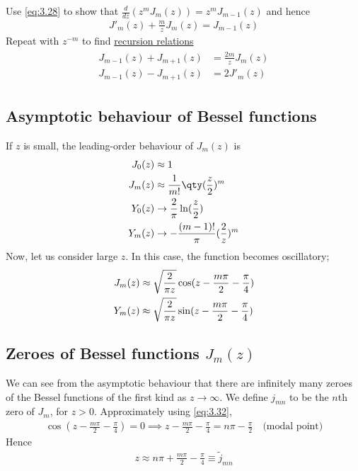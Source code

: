 \begin{exercise}
	Use \cref{eq:3.28} to show that $\frac{d}{dz} (z^m J_m(z)) = z^m J_{m-1}(z)$ and hence
	\begin{align} \label{eq:3.29}
		J'_m(z) + \frac{m}{z} J_m(z) = J_{m-1}(z)
	\end{align}
	Repeat with $z^{-m}$ to find \underline{recursion relations}
	\begin{align} \label{eq:3.30}
		\begin{aligned}
			J_{m-1}(z) + J_{m+1}(z) &= \frac{2m}{z} J_m(z) \\
			J_{m-1}(z) - J_{m+1}(z) &= 2 J'_m(z)
		\end{aligned}
	\end{align} 
\end{exercise} 

\subsection{Asymptotic behaviour of Bessel functions}
If $z$ is small, the leading-order behaviour of $J_m(z)$ is
\begin{align}
	J_0(z) & \approx 1 \notag \\
	J_m(z) & \approx \frac{1}{m!} \qty(\frac{z}{2})^m \notag \\
	Y_0(z) &\to \frac{2}{\pi} \ln(\frac{z}{2}) \notag \\
	Y_m(z) &\to - \frac{(m-1)!}{\pi} (\frac{2}{z})^m \label{eq:3.31}
\end{align}
Now, let us consider large $z$.
In this case, the function becomes oscillatory;
\begin{align}
	J_m(z) &\approx \sqrt{\frac{2}{\pi z}} \cos(z - \frac{m \pi}{2} - \frac{\pi}{4}) \label{eq:3.32} \\
	Y_m(z) &\approx \sqrt{\frac{2}{\pi z}} \sin(z - \frac{m \pi}{2} - \frac{\pi}{4}) \notag
\end{align}

\subsection{Zeroes of Bessel functions $J_m(z)$}
We can see from the asymptotic behaviour that there are infinitely many zeroes of the Bessel functions of the first kind as $z \to \infty$.
We define $j_{mn}$ to be the $n$th zero of $J_m$, for $z > 0$.
Approximately using \cref{eq:3.32},
\begin{align*}
	\cos(z - \frac{m \pi}{2} - \frac{\pi}{4}) = 0 \implies z - \frac{m \pi}{2} - \frac{\pi}{4} = n \pi - \frac{\pi}{2} \quad \text{(modal point)}
\end{align*}
Hence
\begin{align*}
	z \approx n \pi + \frac{m \pi}{2} - \frac{\pi}{4} \equiv \widetilde j_{mn}
\end{align*}

